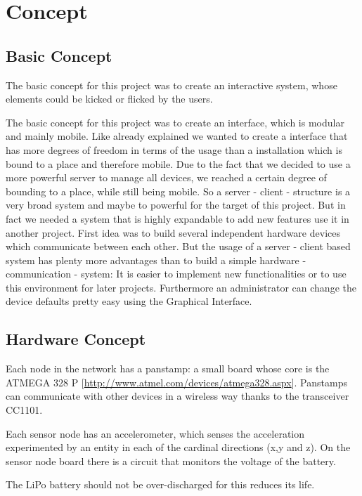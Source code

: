 \section{Concept}

\subsection{Basic Concept}

The basic concept for this project was to create an interactive system, whose elements could be kicked or flicked by the users. 

The basic concept for this project was to create an interface, which is modular and mainly mobile. Like already explained we wanted to create a interface that has more degrees of freedom in terms of the usage than a installation which is bound to a place and therefore mobile. Due to the fact that we decided to use a more powerful server to manage all devices, we reached a certain degree of bounding to a place, while still being mobile. 
So a server - client - structure is a very broad system and maybe to powerful for the target of this project. But in fact we needed a system that is highly expandable to add new features use it in another project.
First idea was to build several independent hardware devices which communicate between each other. But the usage of a server - client based system has plenty more advantages than to build a simple hardware - communication - system:
It is easier to implement new functionalities or to use this environment for later projects. Furthermore an administrator can change the device defaults pretty easy using the Graphical Interface.   

\subsection{Hardware Concept}
Each node in the network has a panstamp: a small board whose core is the ATMEGA 328 P [{\url{http://www.atmel.com/devices/atmega328.aspx}}].
Panstamps can communicate with other devices in a wireless way thanks to the transceiver CC1101. 



Each sensor node has an accelerometer, which senses the acceleration experimented by an entity in each of the cardinal directions (x,y and z).
On the sensor node board there is a circuit that monitors the voltage of the battery.
 
The LiPo battery should not be over-discharged for this reduces its life.
  

